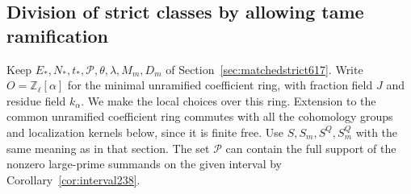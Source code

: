 \documentclass[a4paper,11pt]{article}
\theoremstyle{definition}
\theoremstyle{remark}
\newcommand{\ZZ}{\mathbb Z}\newcommand{\ord}{\operatorname{ord}}
\numberwithin{equation}{section}
\begin{document}
\subsection{Division of strict classes by allowing tame ramification}
\label{sec:dividestrict618}

Keep \(E_*,N_*,t_*,\mathcal P,\theta,\lambda,M_m,D_m\) of
Section~\ref{sec:matchedstrict617}. Write \(O=\ZZ_\ell[\alpha]\)
for the minimal unramified coefficient ring, with fraction field
\(J\) and residue field \(k_\alpha\). We make the local choices over
this ring. Extension to the common unramified coefficient ring
commutes with all the cohomology groups and localization kernels
below, since it is finite free. Use \(S,S_m,S^Q,S_m^Q\) with the
same meaning as in that section. The set \(\mathcal P\) can contain
the full support of the nonzero large-prime summands on the given
interval by Corollary~\ref{cor:interval238}.
\end{document}
